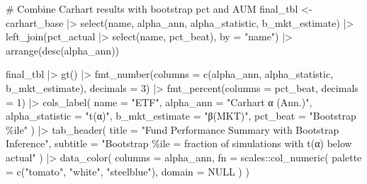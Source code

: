 \documentclass[
  letterpaper,
  DIV=11,
  numbers=noendperiod]{scrartcl}
\newenvironment{Shaded}{\begin{snugshade}}{\end{snugshade}}
\newcommand{\AttributeTok}[1]{\textcolor[rgb]{0.40,0.45,0.13}{#1}}
\newcommand{\CommentTok}[1]{\textcolor[rgb]{0.37,0.37,0.37}{#1}}
\newcommand{\ConstantTok}[1]{\textcolor[rgb]{0.56,0.35,0.01}{#1}}
\newcommand{\DecValTok}[1]{\textcolor[rgb]{0.68,0.00,0.00}{#1}}
\newcommand{\FunctionTok}[1]{\textcolor[rgb]{0.28,0.35,0.67}{#1}}
\newcommand{\NormalTok}[1]{\textcolor[rgb]{0.00,0.23,0.31}{#1}}
\newcommand{\OtherTok}[1]{\textcolor[rgb]{0.00,0.23,0.31}{#1}}
\newcommand{\SpecialCharTok}[1]{\textcolor[rgb]{0.37,0.37,0.37}{#1}}
\newcommand{\StringTok}[1]{\textcolor[rgb]{0.13,0.47,0.30}{#1}}
\begin{document}
\begin{Shaded}
\begin{Highlighting}[]
\CommentTok{\# Combine Carhart results with bootstrap pct and AUM}
\NormalTok{final\_tbl }\OtherTok{\textless{}{-}}\NormalTok{ carhart\_base }\SpecialCharTok{|\textgreater{}}
  \FunctionTok{select}\NormalTok{(name, alpha\_ann, alpha\_statistic, b\_mkt\_estimate) }\SpecialCharTok{|\textgreater{}}
  \FunctionTok{left\_join}\NormalTok{(pct\_actual }\SpecialCharTok{|\textgreater{}} \FunctionTok{select}\NormalTok{(name, pct\_beat), }\AttributeTok{by =} \StringTok{"name"}\NormalTok{) }\SpecialCharTok{|\textgreater{}}
  \FunctionTok{arrange}\NormalTok{(}\FunctionTok{desc}\NormalTok{(alpha\_ann))}

\NormalTok{final\_tbl }\SpecialCharTok{|\textgreater{}}
  \FunctionTok{gt}\NormalTok{() }\SpecialCharTok{|\textgreater{}}
  \FunctionTok{fmt\_number}\NormalTok{(}\AttributeTok{columns =} \FunctionTok{c}\NormalTok{(alpha\_ann, alpha\_statistic, b\_mkt\_estimate), }\AttributeTok{decimals =} \DecValTok{3}\NormalTok{) }\SpecialCharTok{|\textgreater{}}
  \FunctionTok{fmt\_percent}\NormalTok{(}\AttributeTok{columns =}\NormalTok{ pct\_beat, }\AttributeTok{decimals =} \DecValTok{1}\NormalTok{) }\SpecialCharTok{|\textgreater{}}
  \FunctionTok{cols\_label}\NormalTok{(}
    \AttributeTok{name             =} \StringTok{"ETF"}\NormalTok{,}
    \AttributeTok{alpha\_ann        =} \StringTok{"Carhart α (Ann.)"}\NormalTok{,}
    \AttributeTok{alpha\_statistic  =} \StringTok{"t(α)"}\NormalTok{,}
    \AttributeTok{b\_mkt\_estimate   =} \StringTok{"β(MKT)"}\NormalTok{,}
    \AttributeTok{pct\_beat         =} \StringTok{"Bootstrap \%ile"}
\NormalTok{  ) }\SpecialCharTok{|\textgreater{}}
  \FunctionTok{tab\_header}\NormalTok{(}
    \AttributeTok{title    =} \StringTok{"Fund Performance Summary with Bootstrap Inference"}\NormalTok{,}
    \AttributeTok{subtitle =} \StringTok{"Bootstrap \%ile = fraction of simulations with t(α) below actual"}
\NormalTok{  ) }\SpecialCharTok{|\textgreater{}}
  \FunctionTok{data\_color}\NormalTok{(}
    \AttributeTok{columns =}\NormalTok{ alpha\_ann,}
    \AttributeTok{fn =}\NormalTok{ scales}\SpecialCharTok{::}\FunctionTok{col\_numeric}\NormalTok{(}
      \AttributeTok{palette =} \FunctionTok{c}\NormalTok{(}\StringTok{"tomato"}\NormalTok{, }\StringTok{"white"}\NormalTok{, }\StringTok{"steelblue"}\NormalTok{),}
      \AttributeTok{domain  =} \ConstantTok{NULL}
\NormalTok{    )}
\NormalTok{  )}
\end{Highlighting}
\end{Shaded}
\end{document}
